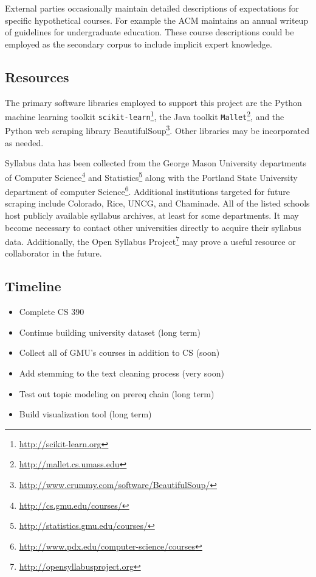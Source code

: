 External parties occasionally maintain detailed descriptions of
expectations for specific hypothetical courses. For example the ACM
maintains an annual writeup of guidelines for undergraduate education.
\cite{CS2013} These course descriptions could be employed as the secondary
corpus to include implicit expert knowledge.


\subsection{Resources}

The primary software libraries employed to support this project are the
Python machine learning toolkit
\texttt{scikit-learn}\footnote{\url{http://scikit-learn.org}}, the Java
toolkit \texttt{Mallet}\footnote{\url{http://mallet.cs.umass.edu}}, and the
Python web scraping library
BeautifulSoup\footnote{\url{http://www.crummy.com/software/BeautifulSoup/}}.
Other libraries may be incorporated as needed.

Syllabus data has been collected from the George Mason University
departments of Computer Science\footnote{\url{http://cs.gmu.edu/courses/}}
and Statistics\footnote{\url{http://statistics.gmu.edu/courses/}} along
with the Portland State University department of computer
Science\footnote{\url{http://www.pdx.edu/computer-science/courses}}.
Additional institutions targeted for future scraping include Colorado,
Rice, UNCG, and Chaminade. All of the listed schools host publicly
available syllabus archives, at least for some departments. It may become
necessary to contact other universities directly to acquire their syllabus
data. Additionally, the Open Syllabus
Project\footnote{\url{http://opensyllabusproject.org}} may prove a useful
resource or collaborator in the future.


\subsection{Timeline}

\begin{itemize}
  \item {\color{green}Complete CS 390}
  \item Continue building university dataset (long term)
  \item Collect all of GMU's courses in addition to CS (soon)
  \item Add stemming to the text cleaning process (very soon)
  \item Test out topic modeling on prereq chain (long term)
  \item Build visualization tool (long term)
\end{itemize}


